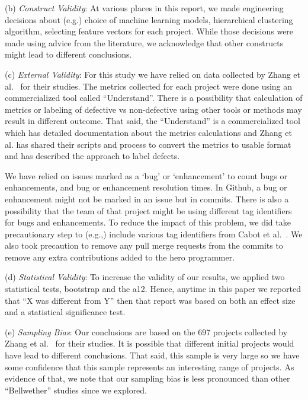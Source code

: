 \documentclass[10pt,journal,compsoc]{IEEEtran}
\begin{document}
    
(b) \textit{Construct Validity}: At various places in this report, we made engineering decisions about (e.g.) choice of machine learning models, hierarchical clustering algorithm, selecting feature vectors for each project. While those decisions were made using advice from the literature, we acknowledge that other constructs might lead to different conclusions. 

(c) \textit{External Validity}: For this study we have relied on data collected by Zhang et al.~\cite{zhang15} for their studies. The metrics collected for each project were done using an commercialized tool called ``Understand''. There is a possibility that calculation of metrics or labeling of defective vs non-defective using other tools or methods may result in different outcome. That said, the ``Understand'' is a commercialized tool which has detailed documentation about the metrics calculations and Zhang et al. has shared their scripts and process to convert the metrics to usable format and has described the approach to label defects.  

We have relied on issues marked as a `bug' or `enhancement' to count bugs or enhancements, and bug or enhancement resolution times. In Github, a bug or enhancement might not be marked in an issue but in commits. There is also a possibility that the team of that project might be using different tag identifiers for bugs and enhancements. To reduce the impact of this problem, we  did take precautionary step to (e.g.,) include various tag identifiers from Cabot et al.~\cite{cabot2015exploring}. We also took precaution to remove any pull merge requests from the commits to remove any extra contributions added to the hero programmer. 

(d) \textit{Statistical Validity}: To increase the validity of our results, we applied two statistical tests, bootstrap and the a12. Hence, anytime in this paper we reported that ``X was different from Y'' then that report was based on both an effect size and a statistical significance test.
 
(e) \textit{Sampling Bias}: Our conclusions are based on the 697 projects collected by Zhang et al.~\cite{zhang15} for their studies. It is possible that different initial projects would have lead to different conclusions. That said, this sample is very large so we have some confidence that this sample represents an interesting range of projects. As evidence of that, we note that our sampling bias is less pronounced than other ``Bellwether'' studies since we explored.
 
\end{document}
